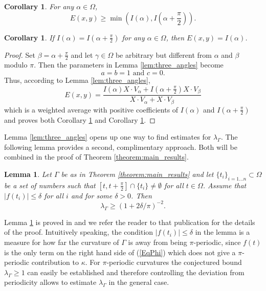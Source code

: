 \documentclass{article}
\newtheorem{corollary}[definition]{Corollary}
\newtheorem{lemma}[definition]{Lemma}
\begin{document}
\begin{corollary} \label{cor:two_angles_corollary}
    For any $\alpha\in\Omega$,
    \begin{equation}
       E(x,y) \ge \min\left(I(\alpha), I(\alpha+\frac\pi 2)\right).
    \end{equation}
\end{corollary}
\begin{corollary} \label{cor:two_angles_equal_I_corollary}
    If $I(\alpha) = I(\alpha+\frac\pi 2)$ for any $\alpha\in\Omega$, then $E(x,y) = I(\alpha)$.
\end{corollary}
\begin{proof}
     Set $\beta = \alpha+\frac{\pi}{2}$ and let $\gamma \in \Omega$ be arbitrary but different from $\alpha$ and $\beta$ modulo $\pi$. Then the parameters in Lemma \ref{lem:three_angles} become
     \[a = b = 1 \text{ and } c = 0.\]
    Thus, according to Lemma \ref{lem:three_angles}, 
    \begin{equation*}
        E(x,y) = \frac{I(\alpha) X \cdot V_\alpha + I(\alpha+\frac{\pi}{2})X \cdot V_\beta}{X \cdot V_\alpha + X \cdot V_\beta }
    \end{equation*}
    which is a weighted average with positive coefficients of $I(\alpha)$ and $I(\alpha+\frac{\pi}{2})$ and proves both Corollary \ref{cor:two_angles_corollary} and Corollary \ref{cor:two_angles_equal_I_corollary}.
\end{proof}

Lemma \ref{lem:three_angles} opens up one way to find estimates for $\lambda_\Gamma$. The following lemma provides a second, complimentary approach. Both will be combined in the proof of Theorem \ref{theorem:main_results}.

\begin{lemma} \label{lem:estimate_lambda_interval}
    Let $\Gamma$ be as in Theorem \ref{theorem:main_results} and let $\{t_i\}_{i=1...n} \subset \Omega$ be a set of numbers such that $[t,t+\frac\pi 2] \cap \{t_i\} \neq \emptyset$ for all $t\in\Omega$. Assume that $|f(t_i)| \le \delta$ for all $i$ and for some $\delta > 0$.
    Then
    \begin{equation} \label{eq:EstimateLambdaVsAlpha}
        \lambda_\Gamma \ge \left(1+2\delta/\pi\right)^{-2}.
    \end{equation}
\end{lemma}

Lemma \ref{lem:estimate_lambda_interval} is proved in \cite{Linde:ALowerBound} and we refer the reader to that publication for the details of the proof. Intuitively speaking, the condition $|f(t_i)| \le \delta$ in the lemma is a measure for how far the curvature of $\Gamma$ is away from being $\pi$-periodic, since $f(t)$ is the only term on the right hand side of (\ref{EqPhi}) which does not give a $\pi$-periodic contribution to $\kappa$. For $\pi$-periodic curvatures the conjectured bound $\lambda_\Gamma \ge 1$ can easily be established and therefore controlling the deviation from periodicity allows to estimate $\lambda_\Gamma$ in the general case.
\end{document}
